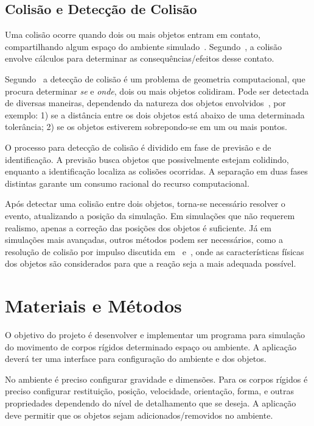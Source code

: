 \documentclass[12pt]{article}
\begin{document}
\subsection{Colisão e Detecção de Colisão}

Uma colisão ocorre quando dois ou mais objetos entram em contato, compartilhando algum espaço do ambiente simulado~\cite{ericson2004real}. Segundo~\cite{bourg2013physics}, a colisão envolve cálculos para determinar as consequências/efeitos desse contato.

Segundo~\cite{bourg2013physics} a detecção de colisão é um problema de geometria computacional, que procura determinar \emph{se} e \emph{onde}, dois ou mais objetos colidiram. Pode ser detectada de diversas maneiras, dependendo da natureza dos objetos envolvidos~\cite{foley1996}, por exemplo: 1) se a distância entre os dois objetos está abaixo de uma determinada tolerância; 2) se os objetos estiverem sobrepondo-se em um ou mais pontos.

O processo para detecção de colisão é dividido em fase de previsão e de identificação. A previsão busca objetos que possivelmente estejam colidindo, enquanto a identificação localiza as colisões ocorridas. A separação em duas fases distintas garante um consumo racional do recurso computacional. 

Após detectar uma colisão entre dois objetos, torna-se necessário resolver o evento, atualizando a posição da simulação. Em simulações que não requerem realismo, apenas a correção das posições dos objetos é suficiente. Já em simulações mais avançadas, outros métodos podem ser necessários, como a resolução de colisão por impulso discutida em~\cite{bourg2013physics} e~\cite{baraff1992dynamic}, onde as características físicas dos objetos são considerados para que a reação seja a mais adequada possível.

\section{Materiais e Métodos}

O objetivo do projeto é desenvolver e implementar um programa para simulação do movimento de corpos rígidos determinado espaço ou ambiente. A aplicação deverá ter uma interface para configuração do ambiente e dos objetos.

No ambiente é preciso configurar gravidade e dimensões. Para os corpos rígidos é preciso configurar restituição, posição, velocidade, orientação, forma, e outras propriedades dependendo do nível de detalhamento que se deseja. A aplicação deve permitir que os objetos sejam adicionados/removidos no ambiente. 
\end{document}
